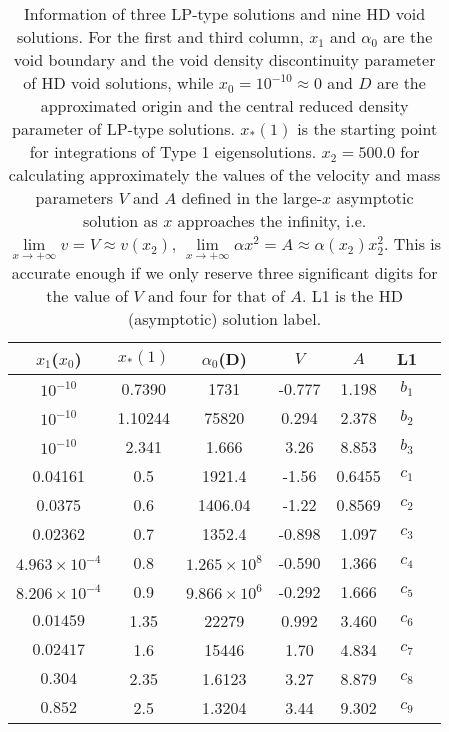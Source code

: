\documentclass[fleqn,usenatbib]{mnras}
\begin{document}
\begin{table}
  \centering
  \caption{Information of three LP-type solutions and nine HD void solutions. For the first and third column, $x_{1}$ and $\alpha_{0}$ are the void boundary and the void density discontinuity parameter of HD void solutions, while $x_{0}=10^{-10}\approx 0$ and $D$ are the approximated origin and the central reduced density parameter of LP-type solutions. $x_{*}(1)$ is the starting point for integrations of Type 1 eigensolutions. $x_{2}=500.0$ for calculating approximately the values of the velocity and mass parameters $V$ and $A$ defined in the large-$x$ asymptotic solution as $x$ approaches the infinity, i.e. $\lim\limits_{x\rightarrow +\infty} v=V\approx v(x_{2})$, $\lim\limits_{x\rightarrow +\infty}\alpha x^{2}=A\approx \alpha(x_{2})x_{2}^{2}$. This is accurate enough if we only reserve three significant digits for the value of $V$ and four for that of $A$. L1 is the HD (asymptotic) solution label.}
    \begin{tabular}{ccccccc}
    \hline
    $x_{1}$($x_{0}$) & $x_{*}(1)$ & $\alpha_{0}$(D) & $V$ & $A$ & L1\\
    \hline
    $10^{-10}$ & 0.7390 & 1731 & -0.777 & 1.198 & $b_{1}$\\
    $10^{-10}$ & 1.10244 & 75820 & 0.294 & 2.378 & $b_{2}$\\
    $10^{-10}$ & 2.341 & 1.666 & 3.26 & 8.853 & $b_{3}$\\
    \hline
    0.04161 & 0.5 & 1921.4 & -1.56 & 0.6455 & $c_{1}$\\
    0.0375 & 0.6 & 1406.04 & -1.22 & 0.8569 & $c_{2}$\\
    0.02362 & 0.7 & 1352.4 & -0.898 & 1.097 & $c_{3}$\\
    $4.963\times 10^{-4}$ & 0.8 & $1.265\times 10^{8}$ & -0.590 & 1.366 & $c_{4}$\\
    $8.206\times 10^{-4}$ & 0.9 & $9.866\times 10^{6}$ & -0.292 & 1.666 &  $c_{5}$\\
    $0.01459$ & 1.35 & 22279 & 0.992 & 3.460 & $c_{6}$\\
    $0.02417$ & 1.6 & 15446 & 1.70 & 4.834 & $c_{7}$\\
    $0.304$ & 2.35 & 1.6123 & 3.27 & 8.879 & $c_{8}$\\
    $0.852$ & 2.5 & 1.3204 & 3.44 & 9.302 & $c_{9}$\\
    \hline
    \end{tabular}
    \label{t1}
\end{table}    
\end{document}
